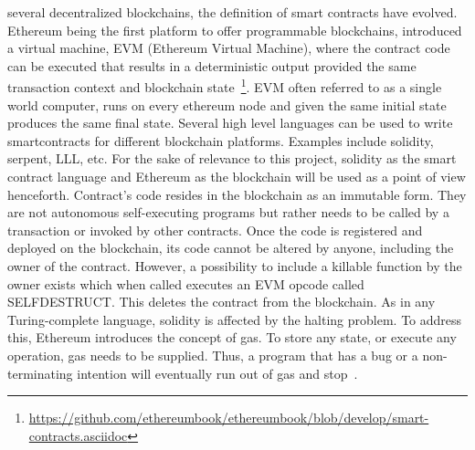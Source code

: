 several decentralized blockchains, the definition of smart contracts have
evolved. Ethereum being the first platform to offer programmable blockchains,
introduced a virtual machine, EVM (Ethereum Virtual Machine), where the
contract code can be executed that results in a deterministic output provided
the same transaction context and blockchain
state~\footnote{\url{https://github.com/ethereumbook/ethereumbook/blob/develop/smart-contracts.asciidoc}}.
EVM often referred to as a single world computer, runs on every ethereum node
and given the same initial state produces the same final state. Several high
level languages can be used to write smartcontracts for different blockchain
platforms. Examples include solidity, serpent, LLL, etc.  For the sake of
relevance to this project, solidity as the smart contract language and Ethereum
as the blockchain will be used as a point of view henceforth. Contract's code
resides in the blockchain as an immutable form.  They are not autonomous
self-executing programs but rather needs to be called by a transaction or
invoked by other contracts. Once the code is registered and deployed on the
blockchain, its code cannot be altered by anyone, including the owner of the
contract. However, a possibility to include a killable function by the owner
exists which when called executes an EVM opcode called SELFDESTRUCT. This
deletes the contract from the blockchain. As in any Turing-complete language,
solidity is affected by the halting problem.  To address this, Ethereum
introduces the concept of gas. To store any state, or execute any operation,
gas needs to be supplied. Thus, a program that has a bug or a non-terminating
intention will eventually run out of gas and stop~\cite{whataresmartcontracts}.








